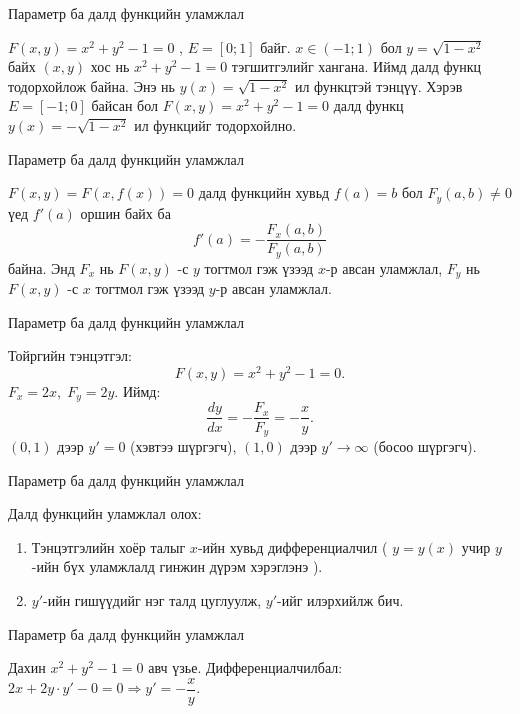 \begin{frame}[allowframebreaks]{Параметр ба далд функцийн уламжлал}
\begin{example}
$F(x,y)=x^2+y^2-1=0$ , $E=[0;1]$ байг. $x\in (-1;1)$ бол $y=\sqrt{1-x^2}$ байх $(x,y)$ хос нь $x^2+y^2-1=0$  тэгшитгэлийг хангана. Иймд далд функц тодорхойлож байна. Энэ нь $y(x)=\sqrt{1-x^2}$ ил функцтэй тэнцүү. Хэрэв $E=[-1;0]$ байсан бол $F(x,y)=x^2+y^2-1=0$ далд функц $y(x)=-\sqrt{1-x^2}$ ил функцийг тодорхойлно.
\end{example}
\end{frame}

\begin{frame}[allowframebreaks]{Параметр ба далд функцийн уламжлал}
\begin{theorem}
$F(x,y)=F(x,f(x))=0$ далд функцийн хувьд $f(a)=b$ бол $F_y(a,b)\neq 0$ үед $f'(a)$ оршин байх ба 
$$f'(a)=-\dfrac{F_x(a,b)}{F_y(a,b)}$$ байна. Энд $F_x$ нь $F(x,y)$ -с $y$ тогтмол гэж үзээд  $x$-р авсан уламжлал, $F_y$ нь $F(x,y)$ -с $x$ тогтмол гэж үзээд  $y$-р авсан уламжлал.
\end{theorem}
\end{frame}

\begin{frame}[allowframebreaks]{Параметр ба далд функцийн уламжлал}
\begin{example}
Тойргийн тэнцэтгэл:
\[
F(x,y)=x^2+y^2-1=0.
\]
$F_x = 2x, \; F_y = 2y$.  
Иймд:
\[
\frac{dy}{dx}=-\frac{F_x}{F_y}=-\frac{x}{y}.
\]
$(0,1)$ дээр $y'=0$ (хэвтээ шүргэгч), $(1,0)$ дээр $y'\to\infty$ (босоо шүргэгч).
\end{example}
\end{frame}

\begin{frame}[allowframebreaks]{Параметр ба далд функцийн уламжлал}
\begin{remark}
Далд функцийн уламжлал олох:
\begin{enumerate}
  \item Тэнцэтгэлийн хоёр талыг $x$-ийн хувьд дифференциалчил ( $y=y(x)$ учир $y$-ийн бүх уламжлалд гинжин дүрэм хэрэглэнэ ).
  \item $y'$-ийн гишүүдийг нэг талд цуглуулж, $y'$-ийг илэрхийлж бич.
\end{enumerate}
\end{remark}
\end{frame}

\begin{frame}[allowframebreaks]{Параметр ба далд функцийн уламжлал}
\begin{example}
Дахин $x^2+y^2-1=0$ авч үзье.
Дифференциалчилбал: $2x+2y\cdot y'-0=0\Rightarrow y'=-\dfrac{x}{y}$.
\end{example}
\end{frame}


